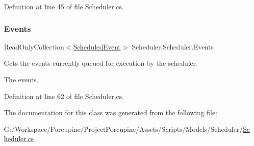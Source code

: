 Definition at line 45 of file Scheduler.\+cs.

\mbox{\label{class_scheduler_1_1_scheduler_a78cb7c8fd7f08a284064373b350ddd4d}} 
\subsubsection{\texorpdfstring{Events}{Events}}
{\footnotesize\ttfamily Read\+Only\+Collection$<$\hyperlink{class_scheduler_1_1_scheduled_event}{Scheduled\+Event}$>$ Scheduler.\+Scheduler.\+Events\hspace{0.3cm}{\ttfamily [get]}}



Gets the events currently queued for execution by the scheduler. 

The events.

Definition at line 62 of file Scheduler.\+cs.



The documentation for this class was generated from the following file\+:\begin{DoxyCompactItemize}
\item 
G\+:/\+Workspace/\+Porcupine/\+Project\+Porcupine/\+Assets/\+Scripts/\+Models/\+Scheduler/\hyperlink{_scheduler_8cs}{Scheduler.\+cs}\end{DoxyCompactItemize}
